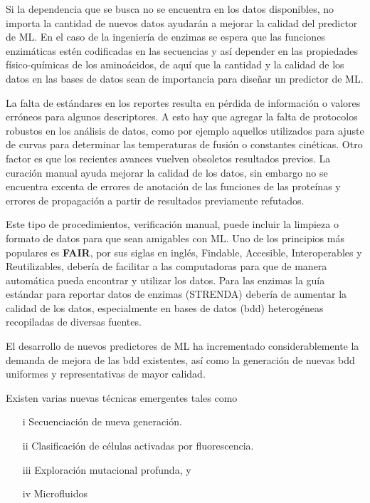 \documentclass[12pt]{article}
\begin{document}
Si la dependencia que se busca no se encuentra en los datos disponibles, no importa la cantidad de nuevos datos ayudarán a mejorar la calidad del predictor de ML. En el caso de la ingeniería de enzimas se espera que las funciones enzimáticas estén codificadas en las secuencias y así depender en las propiedades físico-químicas de los aminoácidos, de aquí que la cantidad y la calidad de los datos en las bases de datos sean de importancia para diseñar un predictor de ML.


La falta de estándares en los reportes resulta en pérdida de información o valores erróneos para algunos descriptores. A esto hay que agregar la falta de protocolos robustos en los análisis de datos, como por ejemplo aquellos utilizados para ajuste de curvas para determinar las temperaturas de fusión o constantes cinéticas. Otro factor es que los recientes avances vuelven obsoletos resultados previos. La curación manual ayuda mejorar la calidad de los datos, sin embargo no se encuentra excenta de errores de anotación de las funciones de las proteínas y errores de propagación a partir de resultados previamente refutados.

Este tipo de procedimientos, verificación manual, puede incluir la limpieza o formato de datos para que sean amigables con ML. Uno de los principios más populares es \textbf{FAIR}, por sus siglas en inglés, Findable, Accesible, Interoperables y Reutilizables, debería de facilitar a las computadoras para que de manera automática pueda encontrar y utilizar los datos. Para las enzimas la guía estándar para reportar datos de enzimas (STRENDA) debería de aumentar la calidad de los datos, especialmente en bases de datos (bdd) heterogéneas recopiladas de diversas fuentes.


El desarrollo de nuevos predictores de ML ha incrementado considerablemente la demanda de mejora de las bdd existentes, así como la generación de nuevas bdd uniformes y representativas de mayor calidad. 

Existen varias nuevas técnicas emergentes tales como

\begin{itemize}
\item[i ] Secuenciación de nueva generación.
\item[ii ] Clasificación de células activadas por fluorescencia.
\item[iii ]  Exploración mutacional profunda, y  
\item[iv ] Microfluidos

\end{itemize}
\end{document}
